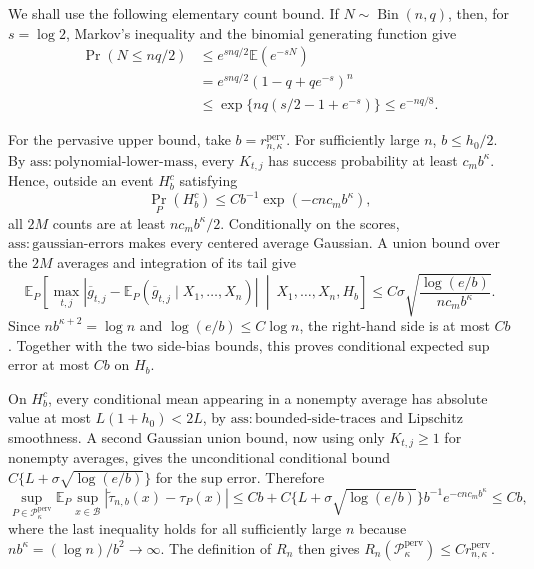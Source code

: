 We shall use the following elementary count bound.  If \(N\sim\operatorname{Bin}(n,q)\), then, for \(s=\log2\), Markov's inequality and the binomial generating function give
\[
 \begin{aligned}
 \Pr(N\le nq/2)
 &\le e^{snq/2}\mathbb E(e^{-sN})\\
 &=e^{snq/2}(1-q+qe^{-s})^n\\
 &\le\exp\{nq(s/2-1+e^{-s})\}
 \le e^{-nq/8}.
 \end{aligned}
\]

For the pervasive upper bound, take \(b=r_{n,\kappa}^{\mathrm{perv}}\).  For sufficiently large \(n\), \(b\le h_0/2\).  By \(\mathrm{ass:polynomial\text{-}lower\text{-}mass}\), every \(K_{t,j}\) has success probability at least \(c_mb^\kappa\).  Hence, outside an event \(H_b^c\) satisfying
\[
 \Pr_P(H_b^c)\le Cb^{-1}\exp(-c n c_mb^\kappa),
\]
all \(2M\) counts are at least \(nc_mb^\kappa/2\).  Conditionally on the scores, \(\mathrm{ass:gaussian\text{-}errors}\) makes every centered average Gaussian.  A union bound over the \(2M\) averages and integration of its tail give
\[
 \mathbb E_P\left[
 \max_{t,j}|\overline g_{t,j}-\mathbb E_P(\overline g_{t,j}\mid X_1,\ldots,X_n)|
 \ \middle|\ X_1,\ldots,X_n,H_b\right]
 \le C\sigma\sqrt{\frac{\log(e/b)}{n c_mb^\kappa}}.
\]
Since \(nb^{\kappa+2}=\log n\) and \(\log(e/b)\le C\log n\), the right-hand side is at most \(Cb\).  Together with the two side-bias bounds, this proves conditional expected sup error at most \(Cb\) on \(H_b\).

On \(H_b^c\), every conditional mean appearing in a nonempty average has absolute value at most \(L(1+h_0)<2L\), by \(\mathrm{ass:bounded\text{-}side\text{-}traces}\) and Lipschitz smoothness.  A second Gaussian union bound, now using only \(K_{t,j}\ge1\) for nonempty averages, gives the unconditional conditional bound \(C\{L+\sigma\sqrt{\log(e/b)}\}\) for the sup error.  Therefore
\[
 \sup_{P\in\mathcal P_\kappa^{\mathrm{perv}}}
 \mathbb E_P\sup_{x\in\mathcal B}|\widetilde\tau_{n,b}(x)-\tau_P(x)|
 \le Cb+C\{L+\sigma\sqrt{\log(e/b)}\}b^{-1}e^{-c n c_mb^\kappa}
 \le Cb,
\]
where the last inequality holds for all sufficiently large \(n\) because \(n b^\kappa=(\log n)/b^2\to\infty\).  The definition of \(R_n\) then gives \(R_n(\mathcal P_\kappa^{\mathrm{perv}})\le Cr_{n,\kappa}^{\mathrm{perv}}\).

